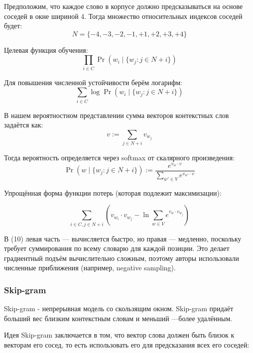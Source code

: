 Предположим, что каждое слово в корпусе должно предсказываться на основе соседей в окне шириной 4. Тогда множество относительных индексов соседей будет:
\begin{equation}
N = \{-4, -3, -2, -1, +1, +2, +3, +4\}
\end{equation}


Целевая функция обучения:
\begin{equation}
\prod_{i \in C} \Pr(w_i \mid \{w_j : j \in N+i\})
\end{equation}

Для повышения численной устойчивости берём логарифм:
\begin{equation}
\sum_{i \in C} \log \Pr(w_i \mid \{w_j : j \in N+i\})
\end{equation}

В нашем вероятностном представлении сумма векторов контекстных слов задаётся как:
\begin{equation}
v := \sum_{j \in N+i} v_{w_j}
\end{equation}

Тогда вероятность определяется через softmax от скалярного произведения:
\begin{equation}
\Pr(w \mid \{w_j : j \in N+i\}) := \frac{e^{v_w \cdot v}}{\sum_{w' \in V} e^{v_{w'} \cdot v}}
\end{equation}

Упрощённая форма функции потерь (которая подлежит максимизации):

\begin{equation}
\sum_{i \in C, j \in N+i} \left( v_{w_i} \cdot v_{w_j} - \ln \sum_{w \in V} e^{v_w \cdot v_{w_j}} \right)
\end{equation}

В (10) левая часть — вычисляется быстро, но правая — медленно, поскольку требует суммирования по всему словарю для каждой позиции. Это делает градиентный подъём вычислительно сложным, поэтому авторы использовали численные приближения (например, negative sampling).

\subsubsection{Skip-gram}

Skip-gram - непрерывная модель со скользящим окном.
Skip-gram придаёт больший вес близким контекстным словам и меньший —более удалённым. 
 
Идея Skip-gram заключается в том, что вектор слова должен быть близок к векторам его сосед, то есть использовать его для предсказания всех его соседей:

